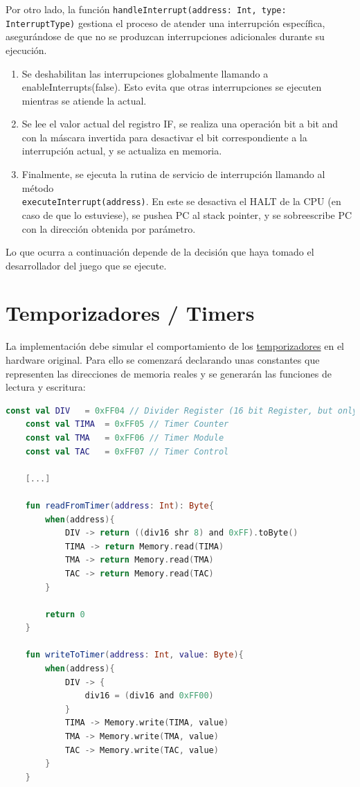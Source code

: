 Por otro lado, la función \texttt{handleInterrupt(address: Int, type: InterruptType)} gestiona el proceso de atender una interrupción específica, asegurándose de que no se produzcan interrupciones adicionales durante su ejecución.

\begin{enumerate}
    \item Se deshabilitan las interrupciones globalmente llamando a enableInterrupts(false). Esto evita que otras interrupciones se ejecuten mientras se atiende la actual.
    \item Se lee el valor actual del registro IF, se realiza una operación bit a bit and con la máscara invertida para desactivar el bit correspondiente a la interrupción actual, y se actualiza en memoria.
    \item Finalmente, se ejecuta la rutina de servicio de interrupción llamando al método \\
    \texttt{executeInterrupt(address)}. En este se desactiva el HALT de la CPU (en caso de que lo estuviese), se pushea PC al stack pointer, y se sobreescribe PC con la dirección obtenida por parámetro. 
\end{enumerate}

Lo que ocurra a continuación depende de la decisión que haya tomado el desarrollador del juego que se ejecute.

\section{Temporizadores / Timers}

La implementación debe simular el comportamiento de los \hyperref[history_timer]{temporizadores} en el hardware original. Para ello se comenzará declarando unas constantes que representen las direcciones de memoria reales y se generarán las funciones de lectura y escritura:

\begin{lstlisting}[language=Kotlin, caption={Lectura y escritura en registros de Timers.}, label={code:timerwriteread}]
    const val DIV   = 0xFF04 // Divider Register (16 bit Register, but only the upper 8 bit (0-7) are public to the developer)
    const val TIMA  = 0xFF05 // Timer Counter
    const val TMA   = 0xFF06 // Timer Module
    const val TAC   = 0xFF07 // Timer Control

    [...]

    fun readFromTimer(address: Int): Byte{
        when(address){
            DIV -> return ((div16 shr 8) and 0xFF).toByte()
            TIMA -> return Memory.read(TIMA)
            TMA -> return Memory.read(TMA)
            TAC -> return Memory.read(TAC)
        }

        return 0
    }

    fun writeToTimer(address: Int, value: Byte){
        when(address){
            DIV -> {
                div16 = (div16 and 0xFF00)
            }
            TIMA -> Memory.write(TIMA, value)
            TMA -> Memory.write(TMA, value)
            TAC -> Memory.write(TAC, value)
        }
    }
\end{lstlisting}

